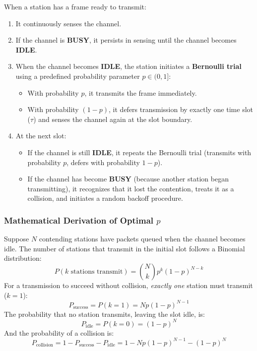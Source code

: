 \documentclass[12pt, a4paper]{article}
\begin{document}
When a station has a frame ready to transmit:
\begin{enumerate}
    \item It continuously senses the channel.
    \item If the channel is \textbf{BUSY}, it persists in sensing until the channel becomes \textbf{IDLE}.
    \item When the channel becomes \textbf{IDLE}, the station initiates a \textbf{Bernoulli trial} using a predefined probability parameter $p \in (0, 1]$:
    \begin{itemize}
        \item With probability $p$, it transmits the frame immediately.
        \item With probability $(1 - p)$, it defers transmission by exactly one time slot ($\tau$) and senses the channel again at the slot boundary.
    \end{itemize}
    \item At the next slot:
    \begin{itemize}
        \item If the channel is still \textbf{IDLE}, it repeats the Bernoulli trial (transmits with probability $p$, defers with probability $1-p$).
        \item If the channel has become \textbf{BUSY} (because another station began transmitting), it recognizes that it lost the contention, treats it as a collision, and initiates a random backoff procedure.
    \end{itemize}
\end{enumerate}

\subsubsection{Mathematical Derivation of Optimal $p$}
Suppose $N$ contending stations have packets queued when the channel becomes idle. The number of stations that transmit in the initial slot follows a Binomial distribution:
\begin{equation}
    P(k \text{ stations transmit}) = \binom{N}{k} p^k (1 - p)^{N - k}
\end{equation}
For a transmission to succeed without collision, \textit{exactly one} station must transmit ($k = 1$):
\begin{equation}
    P_{\text{success}} = P(k = 1) = N p (1 - p)^{N - 1}
\end{equation}
The probability that no station transmits, leaving the slot idle, is:
\begin{equation}
    P_{\text{idle}} = P(k = 0) = (1 - p)^N
\end{equation}
And the probability of a collision is:
\begin{equation}
    P_{\text{collision}} = 1 - P_{\text{success}} - P_{\text{idle}} = 1 - N p (1 - p)^{N - 1} - (1 - p)^N
\end{equation}
\end{document}
